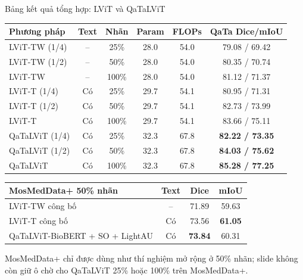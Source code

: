 \documentclass[aspectratio=169,11pt]{beamer}
\newcommand{\smallnote}[1]{%
  \par
  \vspace{0.12cm}
  {\footnotesize\color{ink}#1\par}
}
\begin{document}
\begin{frame}{Bảng kết quả tổng hợp: LViT và QaTaLViT}
  \centering
  \tiny
  \renewcommand{\arraystretch}{1.08}
  \begin{tabular}{lccccc}
    \toprule
    \textbf{Phương pháp} & \textbf{Text} & \textbf{Nhãn} & \textbf{Param} & \textbf{FLOPs} & \textbf{QaTa Dice/mIoU} \\
    \midrule
    LViT-TW (1/4) & -- & 25\% & 28.0 & 54.0 & 79.08 / 69.42 \\
    LViT-TW (1/2) & -- & 50\% & 28.0 & 54.0 & 80.35 / 70.74 \\
    LViT-TW & -- & 100\% & 28.0 & 54.0 & 81.12 / 71.37 \\
    LViT-T (1/4) & Có & 25\% & 29.7 & 54.1 & 80.95 / 71.31 \\
    LViT-T (1/2) & Có & 50\% & 29.7 & 54.1 & 82.73 / 73.99 \\
    LViT-T & Có & 100\% & 29.7 & 54.1 & 83.66 / 75.11 \\
    QaTaLViT (1/4) & Có & 25\% & 32.3 & 67.8 & \textbf{82.22 / 73.35} \\
    QaTaLViT (1/2) & Có & 50\% & 32.3 & 67.8 & \textbf{84.03 / 75.62} \\
    QaTaLViT & Có & 100\% & 32.3 & 67.8 & \textbf{85.28 / 77.25} \\
    \bottomrule
  \end{tabular}
  \vspace{0.15cm}
  \begin{tabular}{lccc}
    \toprule
    \textbf{MosMedData+ 50\% nhãn} & \textbf{Text} & \textbf{Dice} & \textbf{mIoU} \\
    \midrule
    LViT-TW công bố & -- & 71.89 & 59.63 \\
    LViT-T công bố & Có & 73.56 & \textbf{61.05} \\
    QaTaLViT-BioBERT + SO + LightAU & Có & \textbf{73.84} & 60.31 \\
    \bottomrule
  \end{tabular}
  \smallnote{MosMedData+ chỉ được dùng như thí nghiệm mở rộng ở 50\% nhãn; slide không còn giữ ô chờ cho QaTaLViT 25\% hoặc 100\% trên MosMedData+.}
\end{frame}
\end{document}
